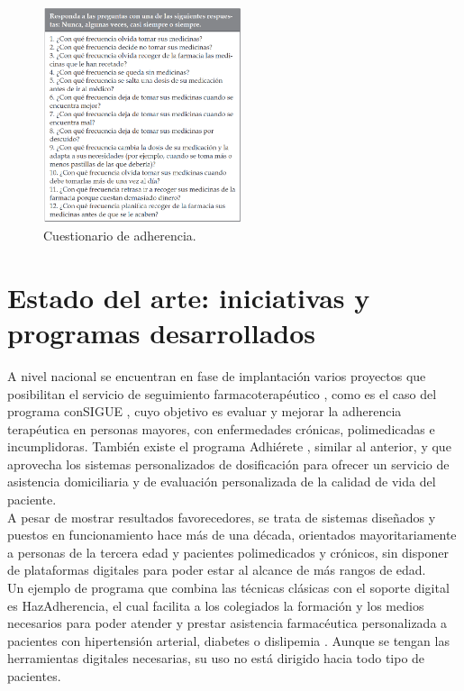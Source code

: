 \begin{figure}[h!]
	\centering
	\includegraphics[width=0.52\textwidth]{imagenes/cuestionario_adherencia.png}
	\caption{Cuestionario de adherencia.}
	\label{fig:cuestionario_adherencia}
\end{figure}


\section{Estado del arte: iniciativas y programas desarrollados}
A nivel nacional se encuentran en fase de implantación varios proyectos que posibilitan el servicio de seguimiento farmacoterapéutico \cite{CONTHE2014336}, como es el caso del programa conSIGUE \cite{programa_consigue}, cuyo objetivo es evaluar y mejorar la adherencia terapéutica en personas mayores, con enfermedades crónicas, polimedicadas e incumplidoras. También existe el programa Adhiérete \cite{programa_adhierete_2015}, similar al anterior, y que aprovecha los sistemas personalizados de dosificación para ofrecer un servicio de asistencia domiciliaria y de evaluación personalizada de la calidad de vida del paciente. \\
A pesar de mostrar resultados favorecedores, se trata de sistemas diseñados y puestos en funcionamiento hace más de una década, orientados mayoritariamente a personas de la tercera edad y pacientes polimedicados y crónicos, sin disponer de plataformas digitales para poder estar al alcance de más rangos de edad. \\

Un ejemplo de programa que combina las técnicas clásicas con el soporte digital es HazAdherencia, el cual facilita a los colegiados la formación y los medios necesarios para poder atender y prestar asistencia farmacéutica personalizada a pacientes con hipertensión arterial, diabetes o dislipemia \cite{hazadherencia2024}. Aunque se tengan las herramientas digitales necesarias, su uso no está dirigido hacia todo tipo de pacientes. \\

